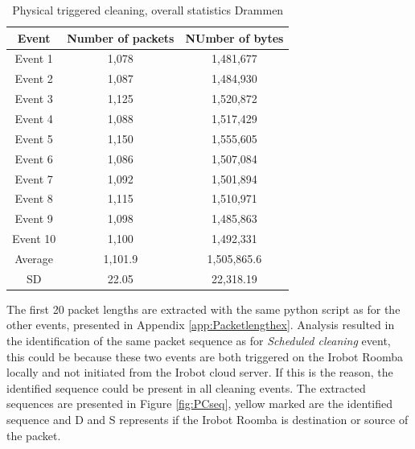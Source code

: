 \begin{table}[H]
\centering
\caption{Physical triggered cleaning, overall statistics Drammen}
\label{tab:PCoverallDRA}
\begin{tabular}{|c|c|c|}
\hline
\textbf{Event} & \textbf{Number of packets} & \textbf{NUmber of bytes} \\ \hline
Event 1        & 1,078                   & 1,481,677                   \\ \hline
Event 2        & 1,087                   & 1,484,930                   \\ \hline
Event 3        & 1,125                   & 1,520,872                   \\ \hline
Event 4        & 1,088                   & 1,517,429                   \\ \hline
Event 5        & 1,150                   & 1,555,605                   \\ \hline
Event 6        & 1,086                   & 1,507,084                   \\ \hline
Event 7        & 1,092                   & 1,501,894                   \\ \hline
Event 8        & 1,115                   & 1,510,971                   \\ \hline
Event 9        & 1,098                   & 1,485,863                   \\ \hline
Event 10       & 1,100                   & 1,492,331                   \\ \hline
Average        & 1,101.9                 & 1,505,865.6                 \\ \hline
SD        &22.05
       & 22,318.19               \\ \hline
\end{tabular}
\end{table}

The first 20 packet lengths are extracted with the same python script as for the other events, presented in Appendix \ref{app:Packetlengthex}. Analysis resulted in the identification of the same packet sequence as for \textit{Scheduled cleaning} event, this could be because these two events are both triggered on the Irobot Roomba locally and not initiated from the Irobot cloud server. If this is the reason, the identified sequence could be present in all cleaning events. The extracted sequences are presented in Figure \ref{fig:PCseq}, yellow marked are the identified sequence and D and S represents if the Irobot Roomba is destination or source of the packet. 

